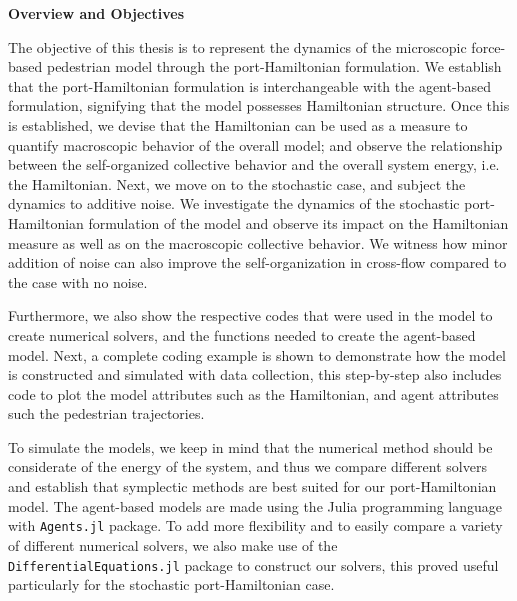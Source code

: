 \textbf{Overview and Objectives}

The objective of this thesis is to represent the dynamics of the microscopic force-based pedestrian model through the port-Hamiltonian formulation. We establish that the port-Hamiltonian formulation is interchangeable with the agent-based formulation, signifying that the model possesses Hamiltonian structure. Once this is established, we devise that the Hamiltonian can be used as a measure to quantify macroscopic behavior of the overall model; and observe the relationship between the self-organized collective behavior and the overall system energy, i.e. the Hamiltonian. Next, we move on to the stochastic case, and subject the dynamics to additive noise. We investigate the dynamics of the stochastic port-Hamiltonian formulation of the model and observe its impact on the Hamiltonian measure as well as on the macroscopic collective behavior. We witness how minor addition of noise can also improve the self-organization in cross-flow compared to the case with no noise.

Furthermore, we also show the respective codes that were used in the model to create numerical solvers, and the functions needed to create the agent-based model. Next, a complete coding example is shown to demonstrate how the model is constructed and simulated with data collection, this step-by-step also includes code to plot the model attributes such as the Hamiltonian, and agent attributes such the pedestrian trajectories.

To simulate the models, we keep in mind that the numerical method should be considerate of the energy of the system, and thus we compare different solvers and establish that symplectic methods are best suited for our port-Hamiltonian model. The agent-based models are made using the Julia programming language with \texttt{Agents.jl} \cite{Agents.jl} package. To add more flexibility and to easily compare a variety of different numerical solvers, we also make use of the \texttt{DifferentialEquations.jl} \cite{rackauckas2017differentialequations} package to construct our solvers, this proved useful particularly for the stochastic port-Hamiltonian case.




